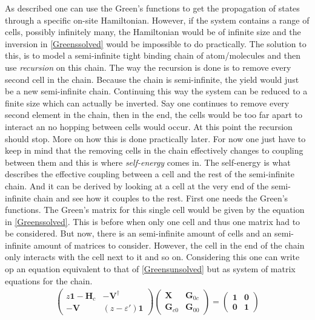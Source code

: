 As described  one can use the Green's functions to get the propagation of states through a specific on-site Hamiltonian. However, if the system contains a range of cells, possibly infinitely many, the Hamiltonian would be of infinite size and the inversion in \cref{Greenssolved} would be impossible to do practically. The solution to this, is to model a semi-infinite tight binding chain of atom/molecules and then use \textit{recursion} on this chain. The way the recursion is done is to remove every second cell in the chain. Because the chain is semi-infinite, the yield would just be a new semi-infinite chain. Continuing this way the system can be reduced to a finite size which can actually be inverted. Say one continues to remove every second element in the chain, then in the end, the cells would be too far apart to interact an no hopping between cells would occur. At this point the recursion should stop. More on how this is done practically later.  For now one just have to keep in mind that the removing cells in the chain effectively changes to coupling between them and this is where \textit{self-energy} comes in. The self-energy is what describes the effective coupling between a cell and the rest of the semi-infinite chain. And it can be derived by looking at a cell at the very end of the semi-infinite chain and see how it couples to the rest. First one needs the Green's functions. The Green's matrix for this single cell would be given by the equation in \cref{Greenssolved}. This is before when only one cell and thus one matrix had to be considered. But now, there is an semi-infinite amount of cells and an semi-infinite amount of matrices to consider. However, the cell in the end of the chain only interacts with the cell next to it and so on. Considering this one can write op an equation equivalent to that of \cref{Greensunsolved} but as system of matrix equations for the chain.
\begin{align}\label{Greenssystem}
	\begin{pmatrix}
		z\mathbf{1}-\mathbf{H}_c & -\mathbf{V}^{\dagger} \\ -\mathbf{V} & (z-\varepsilon')\mathbf{1}
	\end{pmatrix}
	\begin{pmatrix}
		\mathbf{X}      & \mathbf{G}_{0c} \\
		\mathbf{G}_{c0} & \mathbf{G}_{00}
	\end{pmatrix}
	=
	\begin{pmatrix}
		\mathbf{1} & \mathbf{0} \\
		\mathbf{0} & \mathbf{1}
	\end{pmatrix}
\end{align}
